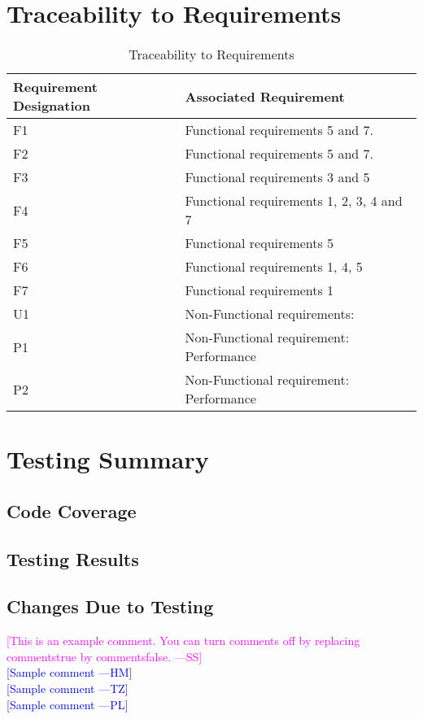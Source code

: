 \documentclass[12pt, titlepage]{article}
\newcommand{\authornote}[3]{\textcolor{#1}{[#3 ---#2]}}
\newcommand{\authornote}[3]{}
\newcommand{\wss}[1]{\authornote{magenta}{SS}{#1}}
\newcommand{\hm}[1]{\authornote{blue}{HM}{#1}} %
\newcommand{\tz}[1]{\authornote{blue}{TZ}{#1}} %
\newcommand{\pl}[1]{\authornote{blue}{PL}{#1}} %
\begin{document}
\section{Traceability to Requirements}
\begin{table}[h!]
\centering
\begin{tabular}{| p{2.5cm} | p{8cm} |}    \hline
	Requirement Designation &Associated Requirement\\ \hline
	F1 &Functional requirements 5 and 7.\\ \hline
	F2 &Functional requirements 5 and 7.\\ \hline
	F3 &Functional requirements 3 and 5 \\ \hline
	F4 &Functional requirements 1, 2, 3, 4 and 7 \\ \hline
	F5 &Functional requirements 5 \\ \hline
	F6 &Functional requirements 1, 4, 5 \\ \hline
	F7 &Functional requirements 1 \\ \hline
	U1 &Non-Functional requirements: \\ \hline
	P1 &Non-Functional requirement: Performance\\ \hline
	P2 &Non-Functional requirement: Performance\\ \hline
\end{tabular}
\caption{Traceability to Requirements}
\label{table:Traceability to Requirements}
\end{table}

\section{Testing Summary}
\subsection{Code Coverage}
\subsection{Testing Results}
\subsection{Changes Due to Testing}

\noindent \wss{This is an example comment.  You can turn comments off by replacing
  commentstrue by commentsfalse.}\\
\hm{Sample comment}\\
\tz{Sample comment}\\
\pl{Sample comment}
\end{document}
